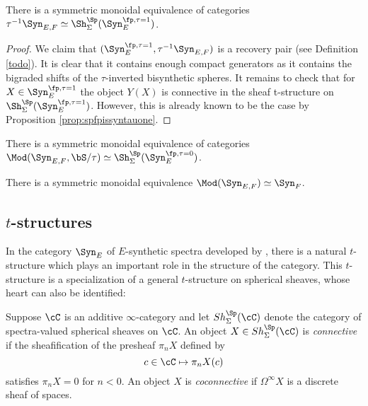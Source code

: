   \begin{proposition}
    There is a symmetric monoidal equivalence  of categories $\tau^{-1}\Syn_{E,F}\simeq \Sh_{\Sigma}^\Sp(\Syn_E^{\fp, \tau=1})$.
  \end{proposition}
  
  \begin{proof}
    We claim that $(\Syn_E^{\fp, \tau=1},\tau^{-1}\Syn_{E,F})$ is a recovery pair (see Definition \ref{todo}). It is clear that it contains enough compact generators as it contains the bigraded shifts of the $\tau$-inverted bisynthetic spheres. It remains to check that for $X\in \Syn_E^{\fp, \tau=1}$ the object $Y(X)$ is connective in the sheaf t-structure on $\Sh_\Sigma^\Sp(\Syn_E^{\fp, \tau=1})$. However, this is already known to be the case by Proposition \ref{prop:spfpissyntauone}.
  \end{proof}
  
  \begin{proposition}
    There is a symmetric monoidal equivalence  of categories $\Mod(\Syn_{E,F}, \bS/\tau)\simeq \Sh_{\Sigma}^\Sp(\Syn_E^{\fp, \tau=0})$.
  \end{proposition}
  
  \begin{theorem}
    There is a symmetric monoidal equivalence $\Mod(\Syn_{E,F})\simeq \Syn_F$.
  \end{theorem}
  
  
  \subsection{$t$-structures}
  
  In the category $\Syn_E$ of $E$-synthetic spectra developed by \cite{Pst22}, there is a natural $t$-structure which plays an important role in the structure of the category. This $t$-structure is a specialization of a general $t$-structure on spherical sheaves, whose heart can also be identified:
  
  \begin{definition}
  \label{con_cocon_defin}
  Suppose $\cC$ is an additive $\infty$-category and let $Sh_{\Sigma}^{\Sp}(\cC)$ denote the category of spectra-valued spherical sheaves on $\cC$. An object $X\in Sh_{\Sigma}^{\Sp}(\cC)$ is \textit{connective} if the sheafification of the presheaf $\pi_nX$ defined by
  $$
  c\in\cC\mapsto \pi_nX(c)
  $$
  satisfies $\pi_nX=0$ for $n<0$. An object $X$ is \textit{coconnective} if $\Omega^{\infty}X$ is a discrete sheaf of spaces.
  \end{definition}
  
